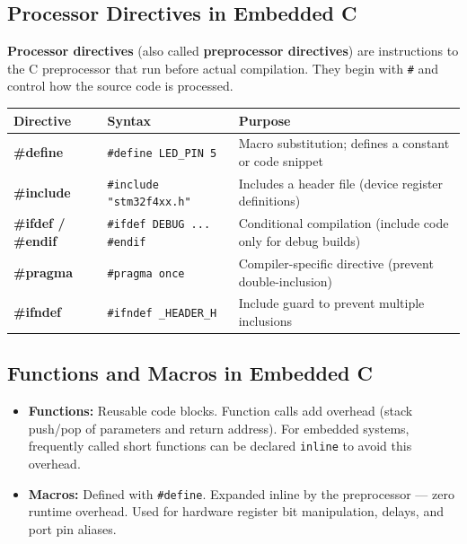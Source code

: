 \documentclass[12pt,a4paper]{article}
\renewcommand{\arraystretch}{1.45}
\begin{document}
\subsection{Processor Directives in Embedded C}

\begin{tcolorbox}[defbox, title={\textbf{Processor Directives}}]
\textbf{Processor directives} (also called \textbf{preprocessor directives}) are instructions to the C preprocessor that run before actual compilation. They begin with \texttt{\#} and control how the source code is processed.
\end{tcolorbox}

\par\noindent
{\renewcommand{\arraystretch}{1.55}%
\begin{tabularx}{\linewidth}{|B{3.0cm}|Y|Y|}
\hline
\textbf{Directive} & \textbf{Syntax} & \textbf{Purpose} \\
\hline
\textbf{\#define} & \texttt{\#define LED\_PIN 5} & Macro substitution; defines a constant or code snippet \\
\hline
\textbf{\#include} & \texttt{\#include "stm32f4xx.h"} & Includes a header file (device register definitions) \\
\hline
\textbf{\#ifdef / \#endif} & \texttt{\#ifdef DEBUG ... \#endif} & Conditional compilation (include code only for debug builds) \\
\hline
\textbf{\#pragma} & \texttt{\#pragma once} & Compiler-specific directive (prevent double-inclusion) \\
\hline
\textbf{\#ifndef} & \texttt{\#ifndef \_HEADER\_H} & Include guard to prevent multiple inclusions \\
\hline
\end{tabularx}}

\subsection{Functions and Macros in Embedded C}
\begin{itemize}[leftmargin=*, itemsep=3pt]
  \item \textbf{Functions:} Reusable code blocks. Function calls add overhead (stack push/pop of parameters and return address). For embedded systems, frequently called short functions can be declared \texttt{inline} to avoid this overhead.
  \item \textbf{Macros:} Defined with \texttt{\#define}. Expanded inline by the preprocessor --- zero runtime overhead. Used for hardware register bit manipulation, delays, and port pin aliases.
\end{itemize}
\end{document}
